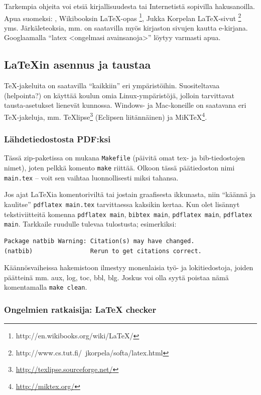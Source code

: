 Tarkempia ohjeita voi etsiä kirjallisuudesta tai Internetistä
sopivilla hakusanoilla. Apua suomeksi: 
, Wikibooksin LaTeX-opas%
\footnote{http://en.wikibooks.org/wiki/LaTeX/}, Jukka Korpelan
LaTeX-sivut%
\footnote{http://www.cs.tut.fi/~jkorpela/softa/latex.html} yms.
Järkäleteoksia, mm.  on saatavilla myös
kirjaston sivujen kautta e-kirjana. Googlaamalla ``latex <ongelmasi
avainsanoja>'' löytyy varmasti apua.

\subsection{\LaTeX{}in asennus ja taustaa}
\label{sec:esimlatexajo}

TeX-jakeluita on saatavilla ``kaikkiin'' eri ympäristöihin.
Suositeltavaa (helpointa?) on käyttää koulun omia Linux-ympäristöjä,
jolloin tarvittavat tausta-asetukset lienevät kunnossa.  Windows- ja
Mac-koneille on saatavana eri TeX-jakeluja, mm.
TeXlipse\footnote{\url{http://texlipse.sourceforge.net/}} (Eclipsen
liitännäinen) ja MiKTeX\footnote{\url{http://miktex.org/}}.

\subsubsection{Lähdetiedostosta PDF:ksi}
\label{sec:esimkaannos}

Tässä zip-paketissa on mukana \verb!Makefile! (päivitä
omat tex- ja bib-tiedostojen nimet), joten pelkkä komento
\verb!make! riittää. Olkoon tässä päätiedoston nimi \verb!main.tex! --
voit sen vaihtaa luonnollisesti miksi tahansa.

Jos ajat \LaTeX{}ia komentoriviltä tai jostain graafisesta ikkunasta,
niin ``käännä ja kaulitse'' \verb!pdflatex main.tex! tarvittaessa kaksikin
kertaa. Kun olet lisännyt tekstiviitteitä komenna \verb!pdflatex main!,
\verb!bibtex main!, \verb!pdflatex main!, \verb!pdflatex main!. Tarkkaile
ruudulle tulevaa tulostusta; esimerkiksi:
%
\begin{verbatim}
Package natbib Warning: Citation(s) may have changed.
(natbib)                Rerun to get citations correct.
\end{verbatim}

Käännösvaiheissa hakemistoon ilmestyy monenlaisia työ- ja 
lokitiedostoja, joiden päätteinä mm. aux, log, toc, bbl, blg.
Joskus voi olla syytä poistaa nämä komentamalla \verb!make clean!.

\subsubsection{Ongelmien ratkaisija: \LaTeX{} checker}
\label{sec:esimlacheck}

